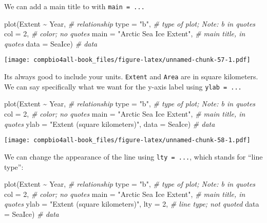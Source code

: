 \documentclass[
]{book}
\newenvironment{Shaded}{\begin{snugshade}}{\end{snugshade}}
\newcommand{\AttributeTok}[1]{\textcolor[rgb]{0.77,0.63,0.00}{#1}}
\newcommand{\CommentTok}[1]{\textcolor[rgb]{0.56,0.35,0.01}{\textit{#1}}}
\newcommand{\DecValTok}[1]{\textcolor[rgb]{0.00,0.00,0.81}{#1}}
\newcommand{\FunctionTok}[1]{\textcolor[rgb]{0.00,0.00,0.00}{#1}}
\newcommand{\NormalTok}[1]{#1}
\newcommand{\SpecialCharTok}[1]{\textcolor[rgb]{0.00,0.00,0.00}{#1}}
\newcommand{\StringTok}[1]{\textcolor[rgb]{0.31,0.60,0.02}{#1}}
\begin{document}
We can add a main title to with \texttt{main\ =\ ...}

\begin{Shaded}
\begin{Highlighting}[]
\FunctionTok{plot}\NormalTok{(Extent }\SpecialCharTok{\textasciitilde{}}\NormalTok{ Year,  }\CommentTok{\# relationship}
     \AttributeTok{type =} \StringTok{"b"}\NormalTok{,     }\CommentTok{\# type of plot; Note: b in quotes}
     \AttributeTok{col =} \DecValTok{2}\NormalTok{,        }\CommentTok{\# color; no quotes}
     \AttributeTok{main =} \StringTok{"Arctic Sea Ice Extent"}\NormalTok{, }\CommentTok{\# main title, in quotes}
     \AttributeTok{data =}\NormalTok{ SeaIce)  }\CommentTok{\# data}
\end{Highlighting}
\end{Shaded}

\texttt{[image: compbio4all-book\_files/figure-latex/unnamed-chunk-57-1.pdf]}

Its always good to include your units. \texttt{Extent} and \texttt{Area} are in square kilometers. We can say specifically what we want for the y-axis label using \texttt{ylab\ =\ ...}

\begin{Shaded}
\begin{Highlighting}[]
\FunctionTok{plot}\NormalTok{(Extent }\SpecialCharTok{\textasciitilde{}}\NormalTok{ Year,  }\CommentTok{\# relationship}
     \AttributeTok{type =} \StringTok{"b"}\NormalTok{,     }\CommentTok{\# type of plot; Note: b in quotes}
     \AttributeTok{col =} \DecValTok{2}\NormalTok{,        }\CommentTok{\# color; no quotes}
     \AttributeTok{main =} \StringTok{"Arctic Sea Ice Extent"}\NormalTok{, }\CommentTok{\# main title, in quotes}
     \AttributeTok{ylab =} \StringTok{"Extent (square kilometers)"}\NormalTok{,}
     \AttributeTok{data =}\NormalTok{ SeaIce)  }\CommentTok{\# data}
\end{Highlighting}
\end{Shaded}

\texttt{[image: compbio4all-book\_files/figure-latex/unnamed-chunk-58-1.pdf]}

We can change the appearance of the line using \texttt{lty\ =\ ...}, which stands for ``line type'':

\begin{Shaded}
\begin{Highlighting}[]
\FunctionTok{plot}\NormalTok{(Extent }\SpecialCharTok{\textasciitilde{}}\NormalTok{ Year,  }\CommentTok{\# relationship}
     \AttributeTok{type =} \StringTok{"b"}\NormalTok{,     }\CommentTok{\# type of plot; Note: b in quotes}
     \AttributeTok{col =} \DecValTok{2}\NormalTok{,        }\CommentTok{\# color; no quotes}
     \AttributeTok{main =} \StringTok{"Arctic Sea Ice Extent"}\NormalTok{, }\CommentTok{\# main title, in quotes}
     \AttributeTok{ylab =} \StringTok{"Extent (square kilometers)"}\NormalTok{,}
     \AttributeTok{lty =} \DecValTok{2}\NormalTok{,        }\CommentTok{\# line type; not quoted}
     \AttributeTok{data =}\NormalTok{ SeaIce)  }\CommentTok{\# data}
\end{Highlighting}
\end{Shaded}
\end{document}
